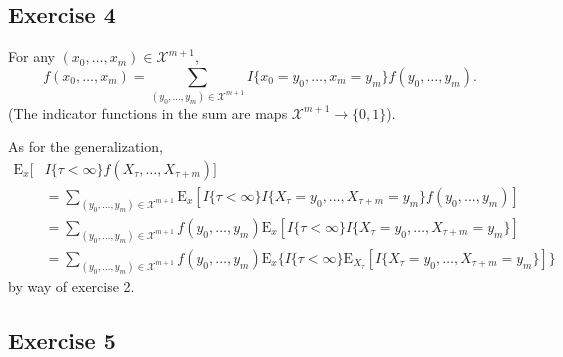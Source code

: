\documentclass[12pt]{article}
\newcommand{\E}{\mathrm{E}}
\begin{document}
\subsection*{Exercise 4}

For any $(x_0, \ldots, x_m) \in \mathcal{X}^{m+1}$,
\begin{equation*}
f(x_0, \ldots, x_m) = \sum_{(y_0, \ldots, y_m) \in \mathcal{X}^{m+1}} I\{x_0 = y_0, \ldots, x_m = y_m\} f(y_0, \ldots, y_m).
\end{equation*}
(The indicator functions in the sum are maps $\mathcal{X}^{m+1} \to \{0, 1\}$).

As for the generalization,
\begin{align*}
\E_x [&I\{\tau < \infty\} f(X_\tau, \ldots, X_{\tau+m})] \\
&= \sum_{(y_0, \ldots, y_m) \in \mathcal{X}^{m+1}} \E_x [I\{\tau < \infty\} I\{X_\tau = y_0, \ldots, X_{\tau+m} = y_m\} f(y_0, \ldots, y_m)] \\
&= \sum_{(y_0, \ldots, y_m) \in \mathcal{X}^{m+1}} f(y_0, \ldots, y_m) \E_x [I\{\tau < \infty\} I\{X_\tau = y_0, \ldots, X_{\tau+m} = y_m\}] \\
&= \sum_{(y_0, \ldots, y_m) \in \mathcal{X}^{m+1}} f(y_0, \ldots, y_m) \E_x \{I\{\tau < \infty\} \E_{X_\tau} [I\{X_\tau = y_0, \ldots, X_{\tau+m} = y_m\}] \}
\end{align*}
by way of exercise 2.

\subsection*{Exercise 5}
\end{document}
